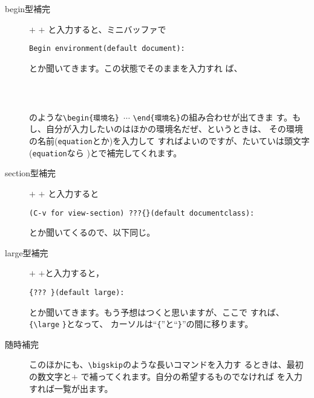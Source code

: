 \begin{description}
 \item[begin型補完]
   $+$ $+$ と入力すると、ミニバッファで
   \begin{screen}
     {\tt Begin environment(default document):}
   \end{screen}
   とか聞いてきます。この状態でそのままを入力すれ
   ば、
   \begin{screen}
\begin{verbatim}



\end{verbatim}
   \end{screen}
   のような\verb+\begin{環境名} +$\cdots$
   \verb+\end{環境名}+の組み合わせが出てきま
   す。もし、自分が入力したいのはほかの環境名だぜ、というときは、
   その環境の名前({\tt equation}とか)を入力して
   すればよいのですが、たいていは頭文字({\tt equation}なら
   )とで補完してくれます。

 \item[section型補完]
   $+$ $+$ と入力すると
   \begin{screen}
     {\tt (C-v for view-section) ???\{\}(default documentclass):}
   \end{screen}
   とか聞いてくるので、以下同じ。

 \item[large型補完]
   $+$ $+$と入力すると，
   \begin{screen}
     {\tt \{??? \}(default large):}
   \end{screen}
   とか聞いてきます。もう予想はつくと思いますが、ここで
   すれば、\verb+{+\verb+\large+ \verb+}+となって、
   カーソルは``\verb+{+''と``\verb+}+''の間に移ります。

 \item[随時補完] このほかにも、\verb+\bigskip+のような長いコマンドを入力す
   るときは、最初の数文字と$+$
   で補ってくれます。自分の希望するものでなければ
   を入力すれば一覧が出ます。


\end{description}
